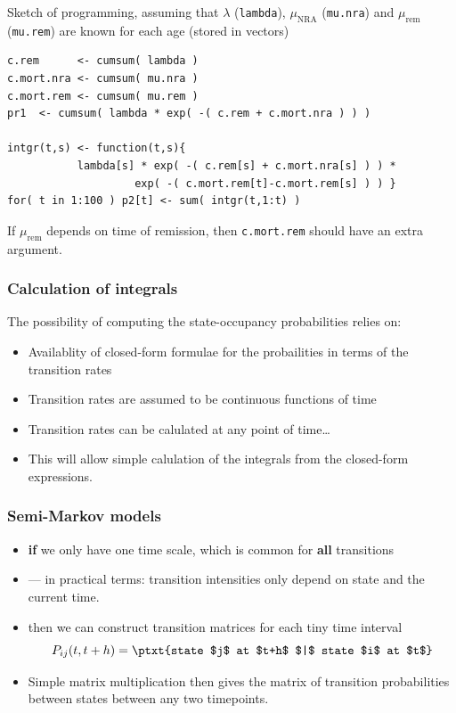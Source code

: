 \begin{frame}[fragile]
  Sketch of programming, assuming that 
$\lambda$ (\texttt{lambda}), 
$\mu_\text{NRA}$ (\texttt{mu.nra}) and
$\mu_\text{rem}$ (\texttt{mu.rem}) are known for each age (stored in vectors)
\renewcommand{\baselinestretch}{0.85}
\footnotesize
\begin{verbatim}
c.rem      <- cumsum( lambda )
c.mort.nra <- cumsum( mu.nra )
c.mort.rem <- cumsum( mu.rem )
pr1  <- cumsum( lambda * exp( -( c.rem + c.mort.nra ) ) )

intgr(t,s) <- function(t,s){
           lambda[s] * exp( -( c.rem[s] + c.mort.nra[s] ) ) *
                    exp( -( c.mort.rem[t]-c.mort.rem[s] ) ) }
for( t in 1:100 ) p2[t] <- sum( intgr(t,1:t) )
\end{verbatim}
\normalsize
\renewcommand{\baselinestretch}{1.00}
If $\mu_\text{rem}$ depends on time of remission, then
\texttt{c.mort.rem} should have an extra argument.
\end{frame}

\begin{frame}
   \frametitle{Calculation of integrals}
The possibility of computing the state-occupancy probabilities relies
on:
   \begin{itemize}[<+->]
   \item Availablity of closed-form formulae for the probailities
     in terms of the transition rates
   \item Transition rates are assumed to be continuous functions of time
   \item Transition rates can be calulated at any point of time\ldots
   \item This will allow simple calulation of the integrals from the
     closed-form expressions.
   \end{itemize}
\end{frame}

\begin{frame}
   \frametitle{Semi-Markov models}
   \begin{itemize}[<+->]
   \item \textbf{if} we only have one time scale, which is common for
     \textbf{all} transitions
   \item --- in practical terms: transition intensities only
     depend on state and the current time.
   \item then we can construct transition matrices for each tiny time
     interval
\[
  P_{ij}(t,t+h) = \ptxt{state $j$ at $t+h$ $|$ state $i$ at $t$}
\]
   \item Simple matrix multiplication then gives the matrix of
     transition probabilities between states between any two timepoints.
   \end{itemize}
\end{frame}
